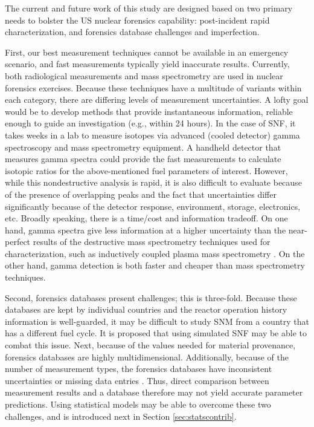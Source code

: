 The current and future work of this study are designed based on two primary
needs to bolster the \gls{US} nuclear forensics capability: post-incident rapid
characterization, and forensics database challenges and imperfection.  

First, our best measurement techniques cannot be available in an emergency
scenario, and fast measurements typically yield inaccurate results.  Currently,
both radiological measurements and mass spectrometry are used in nuclear
forensics exercises.  Because these techniques have a multitude of variants
within each category, there are differing levels of measurement uncertainties.
A lofty goal would be to develop methods that provide instantaneous
information, reliable enough to guide an investigation (e.g., within 24 hours).
In the case of \gls{SNF}, it takes weeks in a lab to measure isotopes via
advanced (cooled detector) gamma spectroscopy and mass spectrometry equipment.
A handheld detector that measures gamma spectra could provide the fast
measurements to calculate isotopic ratios for the above-mentioned fuel
parameters of interest.  However, while this nondestructive analysis is rapid,
it is also difficult to evaluate because of the presence of overlapping peaks
and the fact that uncertainties differ significantly because of the detector
response, environment, storage, electronics, etc. Broadly speaking, there is a
time/cost and information tradeoff. On one hand, gamma spectra give less
information at a higher uncertainty than the near-perfect results of the
destructive mass spectrometry techniques used for characterization, such as
inductively coupled plasma mass spectrometry \cite{iaea_nf}. On the other hand,
gamma detection is both faster and cheaper than mass spectrometry techniques. 

Second, forensics databases present challenges; this is three-fold.  Because
these databases are kept by individual countries and the reactor operation
history information is well-guarded, it may be difficult to study \gls{SNM}
from a country that has a different fuel cycle.  It is proposed that using
simulated \gls{SNF} may be able to combat this issue.  Next, because of the
values needed for material provenance, forensics databases are highly
multidimensional. Additionally, because of the number of measurement types, the
forensics databases have inconsistent uncertainties or missing data entries
\cite{nf_missingdata}.  Thus, direct comparison between measurement results and
a database therefore may not yield accurate parameter predictions. Using
statistical models may be able to overcome these two challenges, and is
introduced next in Section \ref{sec:statscontrib}. 
